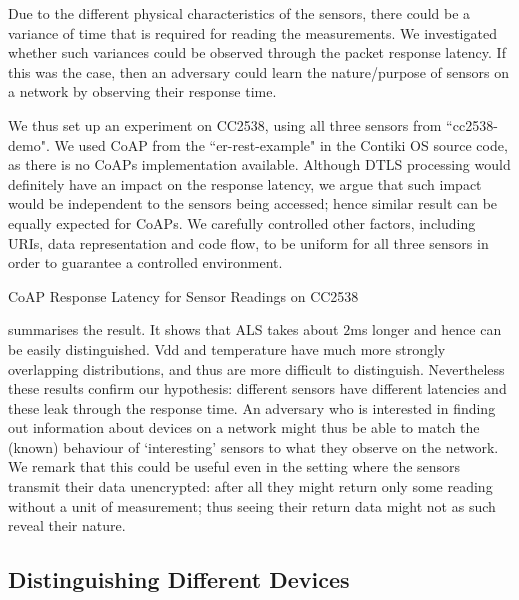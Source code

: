 \documentclass{article}
\begin{document}
Due to the different physical characteristics of the sensors, there could be a variance of time that is required for reading the measurements. We investigated whether such variances could be observed through the packet response latency. If this was the case, then an adversary could learn the nature/purpose of sensors on a network by observing their response time. 

We thus set up an experiment on CC2538, using all three sensors from ``cc2538-demo". We used CoAP from the ``er-rest-example" in the Contiki OS source code, as there is no CoAPs implementation available. Although DTLS processing would definitely have an impact on the response latency, we argue that such impact would be independent to the sensors being accessed; hence similar result can be equally expected for CoAPs. We carefully controlled other factors, including URIs, data representation and code flow, to be uniform for all three sensors in order to guarantee a controlled environment.

\begin{table}
	\center
	
	\caption{CoAP Response Latency for Sensor Readings on CC2538\label{CoapTiming}}
\end{table}

 summarises the result. It shows that ALS takes about $2$ms longer and hence can be easily distinguished. Vdd and temperature have much more strongly overlapping distributions, and thus are more difficult to distinguish. Nevertheless these results confirm  our hypothesis: different sensors have different latencies and these leak through the response time. An adversary who is interested in finding out information about devices on a network might thus be able to match the (known) behaviour of `interesting' sensors to what they observe on the network. We remark that this could be useful even in the setting where the sensors transmit their data unencrypted: after all they might return only some reading without a unit of measurement; thus seeing their return data might not as such reveal their nature. 


\subsection{Distinguishing Different Devices}
\end{document}
